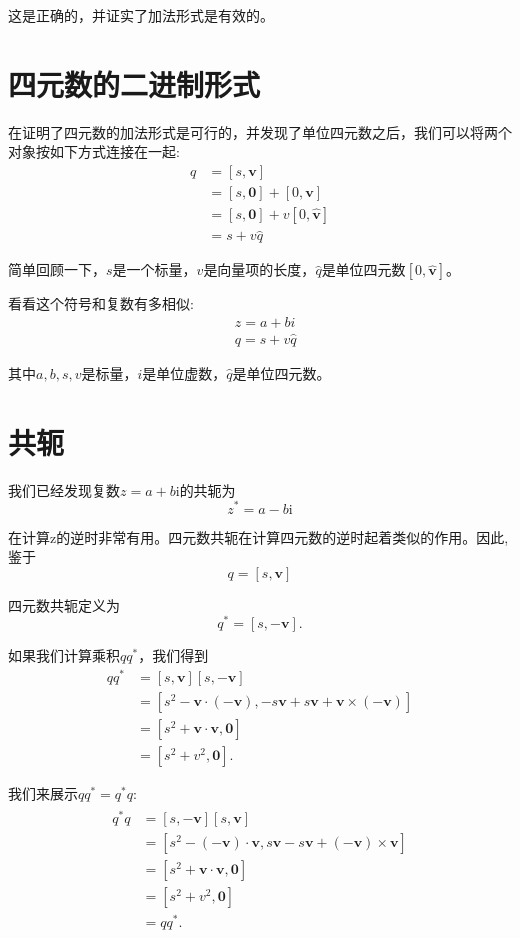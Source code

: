 这是正确的，并证实了加法形式是有效的。

\section{四元数的二进制形式}
在证明了四元数的加法形式是可行的，并发现了单位四元数之后，我们可以将两个对象按如下方式连接在一起:
$$
\begin{aligned}
q & =[s, \mathbf{v}] \\
& =[s, \mathbf{0}]+[0, \mathbf{v}] \\
& =[s, \mathbf{0}]+v[0, \hat{\mathbf{v}}] \\
& =s+v \hat{q}
\end{aligned}
$$

简单回顾一下，$s$是一个标量，$v$是向量项的长度，$\hat{q}$是单位四元数$[0,\hat{\mathbf{v}}]$。

看看这个符号和复数有多相似:
$$
\begin{aligned}
& z=a+b i \\
& q=s+v \hat{q}
\end{aligned}
$$

其中$a, b, s, v$是标量，$i$是单位虚数，$\hat{q}$是单位四元数。

\section{共轭}
我们已经发现复数$z=a+b \mathrm{i}$的共轭为
$$
z^{*}=a-b \mathrm{i}
$$

在计算z的逆时非常有用。四元数共轭在计算四元数的逆时起着类似的作用。因此,鉴于
$$
q=[s, \mathbf{v}]
$$

四元数共轭定义为
$$
q^{*}=[s,-\mathbf{v}] .
$$

如果我们计算乘积$q q^{*}$，我们得到
$$
\begin{aligned}
q q^{*} & =[s, \mathbf{v}][s,-\mathbf{v}] \\
& =\left[s^{2}-\mathbf{v} \cdot(-\mathbf{v}),-s \mathbf{v}+s \mathbf{v}+\mathbf{v} \times(-\mathbf{v})\right] \\
& =\left[s^{2}+\mathbf{v} \cdot \mathbf{v}, \mathbf{0}\right] \\
& =\left[s^{2}+v^{2}, \mathbf{0}\right] .
\end{aligned}
$$

我们来展示$q q^{*}=q^{*} q$:
\begin{align*}
    \begin{aligned}
        q^{*} q & =[s,-\mathbf{v}][s, \mathbf{v}] \\
        & =\left[s^{2}-(-\mathbf{v}) \cdot \mathbf{v}, s \mathbf{v}-s \mathbf{v}+(-\mathbf{v}) \times \mathbf{v}\right] \\
        & =\left[s^{2}+\mathbf{v} \cdot \mathbf{v}, \mathbf{0}\right] \\
        & =\left[s^{2}+v^{2}, \mathbf{0}\right] \\
        & =q q^{*} .
    \end{aligned}
\end{align*}

